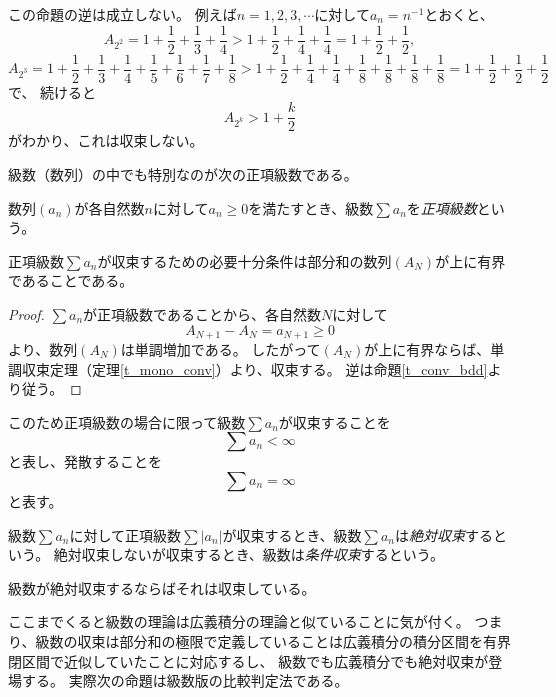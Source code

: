 \begin{remark}
この命題の逆は成立しない。
例えば$n = 1, 2, 3, \cdots$に対して$a_n = n^{-1}$とおくと、
$$
A_{2^2} = 1+\frac{1}{2}+\frac{1}{3}+\frac{1}{4} > 1+\frac{1}{2}+\frac{1}{4}+\frac{1}{4} = 1+\frac{1}{2}+\frac{1}{2},
$$
$$
A_{2^3} = 1+\frac{1}{2}+\frac{1}{3}+\frac{1}{4}+\frac{1}{5}+\frac{1}{6}+\frac{1}{7}+\frac{1}{8} > 1+\frac{1}{2}+\frac{1}{4}+\frac{1}{4}+\frac{1}{8}+\frac{1}{8}+\frac{1}{8}+\frac{1}{8} = 1+\frac{1}{2}+\frac{1}{2}+\frac{1}{2}
$$
で、
続けると
$$
A_{2^k} > 1+\frac{k}{2}
$$
がわかり、これは収束しない。
\end{remark}

級数（数列）の中でも特別なのが次の正項級数である。

\begin{definition}[正項級数]
数列$(a_n)$が各自然数$n$に対して$a_n \ge 0$を満たすとき、級数$\sum a_n$を\emph{正項級数}という。
\end{definition}

\begin{proposition}
正項級数$\sum a_n$が収束するための必要十分条件は部分和の数列$(A_N)$が上に有界であることである。
\end{proposition}

\begin{proof}
$\sum a_n$が正項級数であることから、各自然数$N$に対して
$$
A_{N+1}-A_N = a_{N+1} \ge 0
$$
より、数列$(A_N)$は単調増加である。
したがって$(A_N)$が上に有界ならば、単調収束定理（定理\ref{t_mono_conv}）より、収束する。
逆は命題\ref{t_conv_bdd}より従う。
\end{proof}

このため正項級数の場合に限って級数$\sum a_n$が収束することを
$$
\sum a_n < \infty
$$
と表し、発散することを
$$
\sum a_n = \infty
$$
と表す。

\begin{definition}[級数の絶対収束と条件収束]
級数$\sum a_n$に対して正項級数$\sum |a_n|$が収束するとき、級数$\sum a_n$は\emph{絶対収束}するという。
絶対収束しないが収束するとき、級数は\emph{条件収束}するという。
\end{definition}

\begin{remark}
級数が絶対収束するならばそれは収束している。
\end{remark}

ここまでくると級数の理論は広義積分の理論と似ていることに気が付く。
つまり、級数の収束は部分和の極限で定義していることは広義積分の積分区間を有界閉区間で近似していたことに対応するし、
級数でも広義積分でも絶対収束が登場する。
実際次の命題は級数版の比較判定法である。

